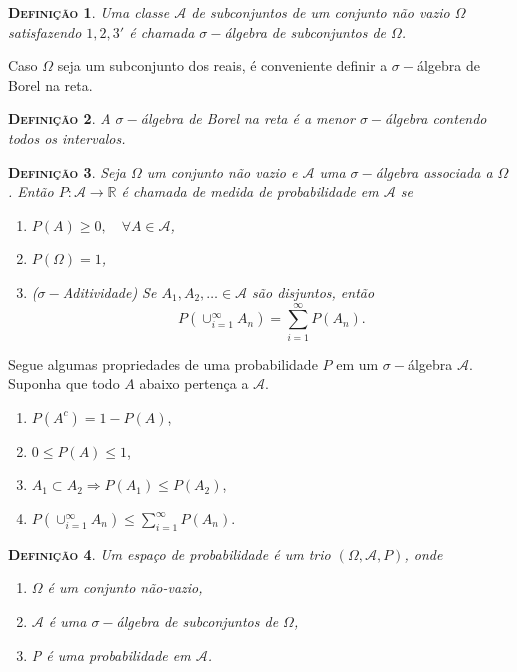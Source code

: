 \documentclass[
	12pt,				%
    oneside,			%
	a4paper,			%
	english,			%
	french,				%
	spanish,			%
	brazil,				%
	]{abntex2}
\newtheorem{definicao}{\scshape Defini\c{c}\~ao}[section]
\begin{document}
        \begin{definicao}
            Uma classe $\mathcal{A}$ de subconjuntos de um conjunto não vazio $\Omega$ satisfazendo $1,2,3'$ é chamada $\sigma-$álgebra de subconjuntos de $\Omega$.
        \end{definicao}

        Caso $\Omega$ seja um subconjunto dos reais, é conveniente definir a $\sigma-$álgebra de Borel na reta.
        \begin{definicao}
            A $\sigma-$álgebra de Borel na reta é a menor $\sigma-$álgebra contendo todos os intervalos.
        \end{definicao}
        \begin{definicao}
            Seja $\Omega$ um conjunto não vazio e $\mathcal{A}$ uma $\sigma-$álgebra associada a $\Omega$. Então $P:\mathcal{A}\to \mathbb{R}$ é chamada de medida de probabilidade em $\mathcal{A}$ se
            \begin{enumerate}
                \item $P(A) \geq 0,\quad \forall A\in\mathcal{A}$,
                \item $P(\Omega) = 1$,
                \item ($\sigma-$Aditividade) Se $A_1,A_2,\dots \in \mathcal{A}$ são disjuntos, então
                        \begin{equation*}
                            P(\cup_{i=1}^{\infty}A_n) = \sum_{i=1}^{\infty}P(A_n).
                        \end{equation*}
            \end{enumerate}
        \end{definicao}

        Segue algumas propriedades de uma probabilidade $P$ em um $\sigma-$álgebra $\mathcal{A}$. Suponha que todo $A$ abaixo pertença a $\mathcal{A}$.
        \begin{enumerate}
            \item $P(A^c) = 1 - P(A)$,
            \item $0\leq P(A) \leq 1$,
            \item $A_1 \subset A_2 \Rightarrow P(A_1) \leq P(A_2)$,
            \item $P(\cup_{i=1}^{\infty}A_n) \leq \sum_{i=1}^{\infty}P(A_n)$.
        \end{enumerate}

        \begin{definicao}
            Um espaço de probabilidade é um trio $\left(\Omega, \mathcal{A}, P\right)$, onde
            \begin{enumerate}[label=\alph*)]
                \item $\Omega$ é um conjunto não-vazio,
                \item $\mathcal{A}$ é uma $\sigma-$álgebra de subconjuntos de $\Omega$,
                \item P é uma probabilidade em $\mathcal{A}$.
            \end{enumerate}
        \end{definicao}
\end{document}
